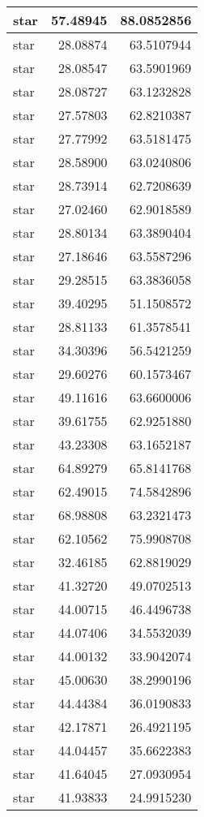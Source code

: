 \documentclass[
]{book}
\theoremstyle{definition}
\theoremstyle{definition}
\theoremstyle{definition}
\theoremstyle{definition}
\theoremstyle{remark}
\begin{document}
\begin{tabular}{l|r|r}
\hline
star & 57.48945 & 88.0852856\\
\hline
star & 28.08874 & 63.5107944\\
\hline
star & 28.08547 & 63.5901969\\
\hline
star & 28.08727 & 63.1232828\\
\hline
star & 27.57803 & 62.8210387\\
\hline
star & 27.77992 & 63.5181475\\
\hline
star & 28.58900 & 63.0240806\\
\hline
star & 28.73914 & 62.7208639\\
\hline
star & 27.02460 & 62.9018589\\
\hline
star & 28.80134 & 63.3890404\\
\hline
star & 27.18646 & 63.5587296\\
\hline
star & 29.28515 & 63.3836058\\
\hline
star & 39.40295 & 51.1508572\\
\hline
star & 28.81133 & 61.3578541\\
\hline
star & 34.30396 & 56.5421259\\
\hline
star & 29.60276 & 60.1573467\\
\hline
star & 49.11616 & 63.6600006\\
\hline
star & 39.61755 & 62.9251880\\
\hline
star & 43.23308 & 63.1652187\\
\hline
star & 64.89279 & 65.8141768\\
\hline
star & 62.49015 & 74.5842896\\
\hline
star & 68.98808 & 63.2321473\\
\hline
star & 62.10562 & 75.9908708\\
\hline
star & 32.46185 & 62.8819029\\
\hline
star & 41.32720 & 49.0702513\\
\hline
star & 44.00715 & 46.4496738\\
\hline
star & 44.07406 & 34.5532039\\
\hline
star & 44.00132 & 33.9042074\\
\hline
star & 45.00630 & 38.2990196\\
\hline
star & 44.44384 & 36.0190833\\
\hline
star & 42.17871 & 26.4921195\\
\hline
star & 44.04457 & 35.6622383\\
\hline
star & 41.64045 & 27.0930954\\
\hline
star & 41.93833 & 24.9915230\\

\end{tabular}
\end{document}
